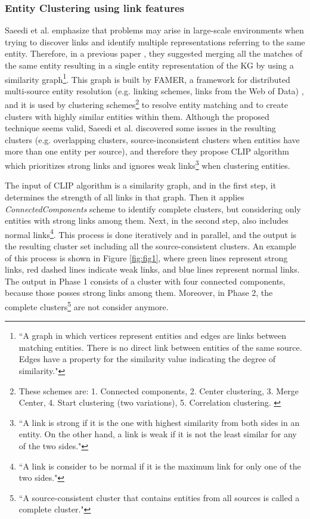 \documentclass[runningheads]{llncs}
\begin{document}
\subsubsection{Entity Clustering using link features} \label{entity-clustering} 
Saeedi et al. \cite{Saeedi} emphasize that problems may arise in large-scale environments when trying to discover links and identify multiple representations referring to the same entity. Therefore, in a previous paper \cite{Peukert}, they suggested merging all the matches of the same entity resulting in a single entity representation of the KG by using a similarity graph\footnote{``A graph in which vertices represent entities and edges are links between matching entities. There is no direct link between entities of the same source. Edges have a property for the similarity value indicating the degree of similarity."\cite{Saeedi}}. This graph is built by FAMER, a framework for distributed multi-source entity resolution (e.g. linking schemes, links from the Web of Data) \cite{Peukert}, and it is used by clustering schemes\footnote{These schemes are: 1. Connected components, 2. Center clustering, 3. Merge Center, 4. Start clustering (two variations), 5. Correlation clustering. \cite{Peukert}} to resolve entity matching and to create clusters with highly similar entities within them. Although the proposed technique seems valid, Saeedi et al. discovered some issues in the resulting clusters (e.g. overlapping clusters, source-inconsistent clusters when entities have more than one entity per source), and therefore they propose CLIP algorithm which prioritizes strong links and ignores weak links\footnote{``A link is strong if it is the one with highest similarity from both sides in an entity. On the other hand, a link is weak if it is not the least similar for any of the two sides."\cite{Saeedi}} when clustering entities. 

The input of CLIP algorithm is a similarity graph, and in the first step, it determines the strength of all links in that graph. Then it applies \textit{ConnectedComponents} scheme to identify complete clusters, but considering only entities with strong links among them. Next, in the second step, also includes normal links\footnote{``A link is consider to be normal if it is the maximum link for only one of the two sides."\cite{Saeedi}}. This process is done iteratively and in parallel, and the output is the resulting cluster set including all the source-consistent clusters. An example of this process is shown in Figure \ref{fig:fig1}, where green lines represent strong links, red dashed lines indicate weak links, and blue lines represent normal links. The output in Phase 1 consists of a cluster with four connected components, because those posses strong links among them. Moreover, in Phase 2, the complete clusters\footnote{``A source-consistent cluster that contains entities from all sources is called a complete cluster."\cite{Saeedi}} are not consider anymore.
\end{document}
